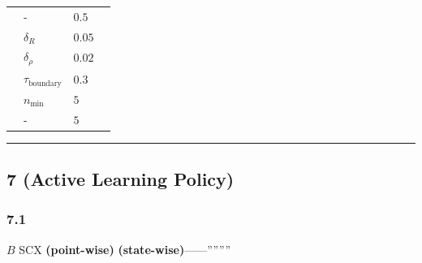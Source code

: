 \documentclass[
  12pt,
]{article}
\begin{document}
\begin{longtable}[]{@{}
  >{\raggedright\arraybackslash}p{}
  >{\raggedright\arraybackslash}p{}
  >{\raggedright\arraybackslash}p{}
  >{\raggedright\arraybackslash}p{}@{}}
\toprule\noalign{}
\begin{minipage}[b]{\linewidth}\raggedright

\end{minipage} & \begin{minipage}[b]{\linewidth}\raggedright

\end{minipage} & \begin{minipage}[b]{\linewidth}\raggedright

\end{minipage} & \begin{minipage}[b]{\linewidth}\raggedright

\end{minipage} \\
\midrule\noalign{}
\endhead
\bottomrule\noalign{}
\endlastfoot
 & - & \(0.5\) &  \\
 & \(\delta_R\) & \(0.05\) &
 \\
 & \(\delta_\rho\) & \(0.02\) &
 \\
 & \(\tau_{\text{boundary}}\) & \(0.3\) &  \\
 & \(n_{\min}\) & \(5\) &  \\
 & - & \(5\) &  \\
\end{longtable}

\begin{center}\rule{0.5\linewidth}{0.5pt}\end{center}

\subsection{ 7 (Active Learning
Policy)}\label{ux6a21ux5757-7ux4e3bux52a8ux5b66ux4e60ux7b56ux7565-active-learning-policy}

\subsubsection{7.1 }\label{ux95eeux9898ux8bbeux5b9a-6}

 \(B\)
SCX
\textbf{ (point-wise)} \textbf{
(state-wise)}------''''''''
\end{document}
